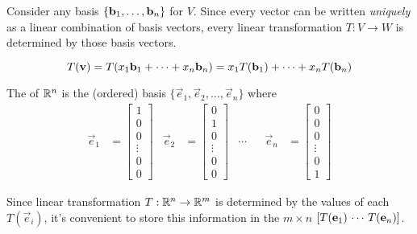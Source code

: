 \begin{applicationActivities}{1}{17}
\begin{fact}
Consider any basis \(\{\mathbf b_1,\dots,\mathbf b_n\}\) for $V$.  Since every vector can be written \textit{uniquely} as a linear combination of basis vectors, every linear transformation $T:V \rightarrow W$ is determined by those basis vectors.

\[
  T(\mathbf v)=T(x_1\mathbf b_1+\dots+ x_n\mathbf b_n)=
  x_1T(\mathbf b_1)+\dots+x_nT(\mathbf b_n)
\]
\end{fact}

\begin{definition}
The  of $\mathbb{R}^n$ is the (ordered) basis $\{\vec{e}_1, \vec{e}_2, \ldots, \vec{e}_n\}$ where
\begin{align*}
\vec{e}_1 &= \begin{bmatrix} 1 \\ 0 \\ 0 \\\vdots \\ 0 \\ 0 \end{bmatrix}  &
\vec{e}_2 &= \begin{bmatrix} 0 \\ 1 \\ 0 \\\vdots \\ 0 \\ 0 \end{bmatrix}  & \cdots  & &
\vec{e}_n &= \begin{bmatrix} 0 \\ 0 \\ 0 \\\vdots \\ 0 \\ 1 \end{bmatrix}
\end{align*}

Since linear transformation \(T:\mathbb{R}^n\to\mathbb{R}^m\) is determined by
the values of each \(T(\vec e_i)\), it's convenient to store this
information in the \(m\times n\) 
\([T(\mathbf e_1) \,\cdots\, T(\mathbf e_n)]\).
\end{definition}



\end{applicationActivities}
